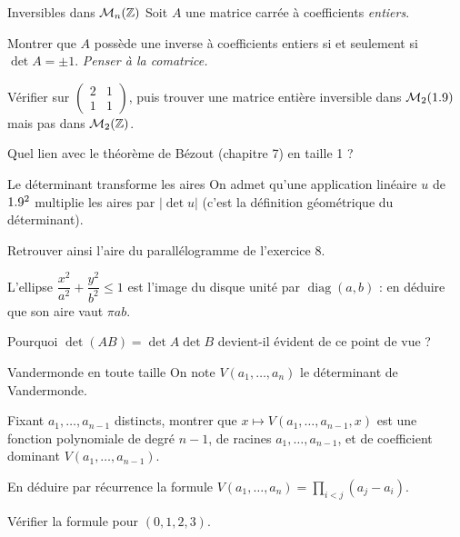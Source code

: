 \begin{exercice}[3]{Inversibles dans $\mathcal{M}_n(\mathbb{Z})$}
Soit $A$ une matrice carrée à coefficients \emph{entiers}.
\begin{questions}
  \item Montrer que $A$ possède une inverse à coefficients entiers si et
    seulement si $\det A=\pm1$. \emph{Penser à la comatrice.}
  \item Vérifier sur $\begin{pmatrix}2&1\\1&1\end{pmatrix}$, puis trouver
    une matrice entière inversible dans $\mathcal{M}_2(1.9)$ mais pas dans
    $\mathcal{M}_2(\mathbb{Z})$.
  \item Quel lien avec le théorème de Bézout (chapitre 7) en taille 1 ?
\end{questions}
\end{exercice}

\begin{exercice}[3]{Le déterminant transforme les aires}
On admet qu'une application linéaire $u$ de $1.9^{2}$ multiplie les aires
par $|\det u|$ (c'est la définition géométrique du déterminant).
\begin{questions}
  \item Retrouver ainsi l'aire du parallélogramme de l'exercice 8.
  \item L'ellipse $\dfrac{x^{2}}{a^{2}}+\dfrac{y^{2}}{b^{2}}\leqslant1$ est
    l'image du disque unité par $\operatorname{diag}(a,b)$ : en déduire que
    son aire vaut $\pi ab$.
  \item Pourquoi $\det(AB)=\det A\det B$ devient-il évident de ce point de
    vue ?
\end{questions}
\end{exercice}

\begin{exercice}[3]{Vandermonde en toute taille}
On note $V(a_1,\dots,a_n)$ le déterminant de Vandermonde.
\begin{questions}
  \item Fixant $a_1,\dots,a_{n-1}$ distincts, montrer que
    $x\mapsto V(a_1,\dots,a_{n-1},x)$ est une fonction polynomiale de degré
    $n-1$, de racines $a_1,\dots,a_{n-1}$, et de coefficient dominant
    $V(a_1,\dots,a_{n-1})$.
  \item En déduire par récurrence la formule
    $V(a_1,\dots,a_n)=\prod_{i<j}(a_j-a_i)$.
  \item Vérifier la formule pour $(0,1,2,3)$.
\end{questions}
\end{exercice}


